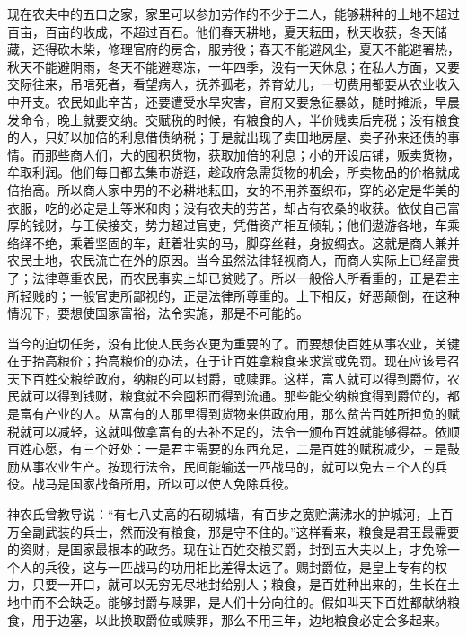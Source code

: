 \documentclass[12pt,UTF-8,openany,a4]{ctexbook}
\begin{document}
\begin{large}
    现在农夫中的五口之家，家里可以参加劳作的不少于二人，能够耕种的土地不超过百亩，百亩的收成，不超过百石。他们春天耕地，夏天耘田，秋天收获，冬天储藏，还得砍木柴，修理官府的房舍，服劳役；春天不能避风尘，夏天不能避署热，秋天不能避阴雨，冬天不能避寒冻，一年四季，没有一天休息；在私人方面，又要交际往来，吊唁死者，看望病人，抚养孤老，养育幼儿，一切费用都要从农业收入中开支。农民如此辛苦，还要遭受水旱灾害，官府又要急征暴敛，随时摊派，早晨发命令，晚上就要交纳。交赋税的时候，有粮食的人，半价贱卖后完税；没有粮食的人，只好以加倍的利息借债纳税；于是就出现了卖田地房屋、卖子孙来还债的事情。而那些商人们，大的囤积货物，获取加倍的利息；小的开设店铺，贩卖货物，牟取利润。他们每日都去集市游逛，趁政府急需货物的机会，所卖物品的价格就成倍抬高。所以商人家中男的不必耕地耘田，女的不用养蚕织布，穿的必定是华美的衣服，吃的必定是上等米和肉；没有农夫的劳苦，却占有农桑的收获。依仗自己富厚的钱财，与王侯接交，势力超过官吏，凭借资产相互倾轧；他们遨游各地，车乘络绎不绝，乘着坚固的车，赶着壮实的马，脚穿丝鞋，身披绸衣。这就是商人兼并农民土地，农民流亡在外的原因。当今虽然法律轻视商人，而商人实际上已经富贵了；法律尊重农民，而农民事实上却已贫贱了。所以一般俗人所看重的，正是君主所轻贱的；一般官吏所鄙视的，正是法律所尊重的。上下相反，好恶颠倒，在这种情况下，要想使国家富裕，法令实施，那是不可能的。
    
    当今的迫切任务，没有比使人民务农更为重要的了。而要想使百姓从事农业，关键在于抬高粮价；抬高粮价的办法，在于让百姓拿粮食来求赏或免罚。现在应该号召天下百姓交粮给政府，纳粮的可以封爵，或赎罪。这样，富人就可以得到爵位，农民就可以得到钱财，粮食就不会囤积而得到流通。那些能交纳粮食得到爵位的，都是富有产业的人。从富有的人那里得到货物来供政府用，那么贫苦百姓所担负的赋税就可以减轻，这就叫做拿富有的去补不足的，法令一颁布百姓就能够得益。依顺百姓心愿，有三个好处：一是君主需要的东西充足，二是百姓的赋税减少，三是鼓励从事农业生产。按现行法令，民间能输送一匹战马的，就可以免去三个人的兵役。战马是国家战备所用，所以可以使人免除兵役。
    
    神农氏曾教导说：“有七八丈高的石砌城墙，有百步之宽贮满沸水的护城河，上百万全副武装的兵士，然而没有粮食，那是守不住的。”这样看来，粮食是君王最需要的资财，是国家最根本的政务。现在让百姓交粮买爵，封到五大夫以上，才免除一个人的兵役，这与一匹战马的功用相比差得太远了。赐封爵位，是皇上专有的权力，只要一开口，就可以无穷无尽地封给别人；粮食，是百姓种出来的，生长在土地中而不会缺乏。能够封爵与赎罪，是人们十分向往的。假如叫天下百姓都献纳粮食，用于边塞，以此换取爵位或赎罪，那么不用三年，边地粮食必定会多起来。
    

\end{large}
\end{document}

